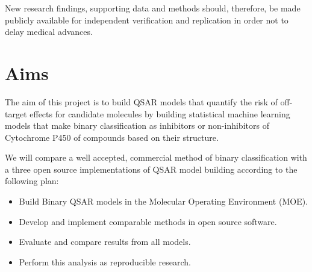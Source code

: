 New research findings, supporting data and methods should, therefore, be made publicly available for independent verification and replication in order not to delay medical advances.

\pagebreak

\section{Aims}
The aim of this project is to build QSAR models that quantify the risk of off-target effects for candidate molecules by building statistical machine learning models that make binary classification as inhibitors or non-inhibitors of Cytochrome P450 of compounds based on their structure.

We will compare a well accepted, commercial method of binary classification with a three open source implementations of QSAR model building according to the following plan:

\begin{itemize}

\item Build Binary QSAR models in the Molecular Operating Environment (MOE).

\item Develop and implement comparable methods in open source software.

\item Evaluate and compare results from all models.

\item Perform this analysis as reproducible research.

\end{itemize}
